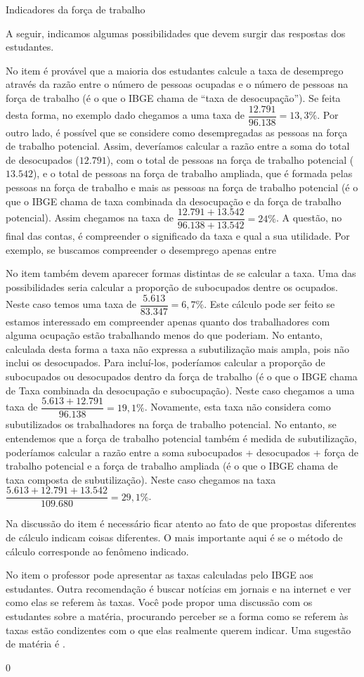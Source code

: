 \begin{answer}{Indicadores da força de trabalho}
{
  A seguir, indicamos algumas possibilidades que devem surgir das respostas dos estudantes.

  No item  é provável que a maioria dos estudantes calcule a taxa de desemprego através da razão entre o número de pessoas ocupadas e o número de pessoas na força de trabalho (é o que o IBGE chama de “taxa de desocupação”). Se feita desta forma, no exemplo dado chegamos a uma taxa de $\dfrac{12.791}{96.138}=13,3\%$. Por outro lado, é possível que se considere como desempregadas as pessoas na força de trabalho potencial. Assim, deveríamos calcular a razão entre a soma do total de desocupados ($12.791$), com o total de pessoas na força de trabalho potencial ($13.542$), e o total de pessoas na força de trabalho ampliada, que é formada pelas pessoas na força de trabalho e mais as pessoas na força de trabalho potencial (é o que o IBGE chama de taxa combinada da desocupação e da força de trabalho potencial). Assim chegamos na taxa de $\dfrac{12.791+13.542}{96.138+13.542}=24\%$. A questão, no final das contas, é compreender o significado da taxa e qual a sua utilidade. Por exemplo, se buscamos compreender o desemprego apenas entre

  No item  também devem aparecer formas distintas de se calcular a taxa. Uma das possibilidades seria calcular a proporção de subocupados dentre os ocupados. Neste caso temos uma taxa de $\dfrac{5.613}{83.347}=6,7\%$. Este cálculo pode ser feito se estamos interessado em compreender apenas quanto dos trabalhadores com alguma ocupação estão trabalhando menos do que poderiam. No entanto, calculada desta forma a taxa não expressa a subutilização mais ampla, pois não inclui os desocupados. Para incluí-los, poderíamos calcular a proporção de subocupados ou desocupados dentro da força de trabalho (é o que o IBGE chama de Taxa combinada da desocupação e subocupação). Neste caso chegamos a uma taxa de $\dfrac{5.613+12.791}{96.138}=19,1\%$. Novamente, esta taxa não considera como subutilizados os trabalhadores na força de trabalho potencial. No entanto, se entendemos que a força de trabalho potencial também é medida de subutilização, poderíamos calcular a razão entre a soma subocupados + desocupados + força de trabalho potencial e a força de trabalho ampliada (é o que o IBGE chama de taxa composta de subutilização). Neste caso chegamos na taxa $\dfrac{5.613+12.791+13.542}{109.680}=29,1\%$.

  Na discussão do item  é necessário ficar atento ao fato de que propostas diferentes de cálculo indicam coisas diferentes. O mais importante aqui é se o método de cálculo corresponde ao fenômeno indicado.

  No item  o professor pode apresentar as taxas calculadas pelo IBGE aos estudantes. Outra recomendação é buscar notícias em jornais e na internet e ver como elas se referem às taxas. Você pode propor uma discussão com os estudantes sobre a matéria, procurando perceber se a forma como se referem às taxas estão condizentes com o que elas realmente querem indicar. Uma sugestão de matéria é \cite{camargo2020}. 

}{0}
\end{answer}
